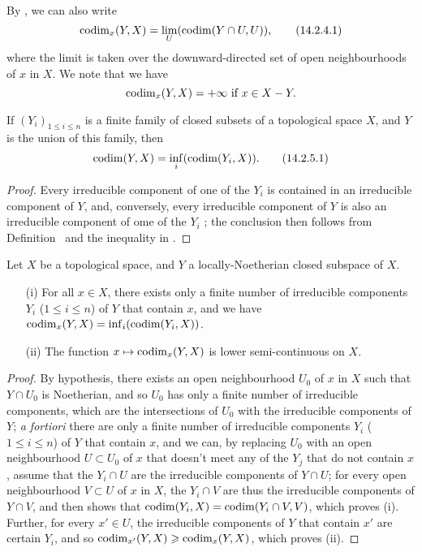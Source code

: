 By , we can also write
\[
\label{eq:0.14.2.4.1}
  \operatorname{codim}_x(Y,X)=\lim_U(\operatorname{codim}(Y\cap U,U)),
  \tag{14.2.4.1}
\]
where the limit is taken over the downward-directed set of open neighbourhoods of $x$ in $X$.
We note that we have
\[
  \operatorname{codim}_x(Y,X)=+\infty\text{ if }x\in X- Y.
\]

\begin{proposition}[14.2.5]
\label{0.14.2.5}
If $(Y_i)_{1\leq i\leq n}$ is a finite family of closed subsets of a topological space $X$, and $Y$ is the union of this family, then
\[
\label{eq:0.14.2.5.1}
  \operatorname{codim}(Y,X)=\inf_i(\operatorname{codim}(Y_i,X)).
  \tag{14.2.5.1}
\]
\end{proposition}

\begin{proof}
\label{proof-0.14.2.5}
Every irreducible component of one of the $Y_i$ is contained in an irreducible component of $Y$, and, conversely, every irreducible component of $Y$ is also an irreducible component of ome of the $Y_i$ ;
the conclusion then follows from Definition~ and the inequality in .
\end{proof}

\begin{corollary}
\label{0.14.2.6}
Let $X$ be a topological space, and $Y$ a locally-Noetherian closed subspace of $X$.
\begin{enumerate}
    \item[{\rm(i)}] For all $x\in X$, there exists only a finite number of irreducible components $Y_i$ ($1\leq i\leq n$) of $Y$ that contain $x$, and we have $\operatorname{codim}_x(Y,X)=\inf_i(\operatorname{codim}(Y_i,X))$.
    \item[{\rm(ii)}] The function $x\mapsto\codim_x(Y,X)$ is lower semi-continuous on $X$.
\end{enumerate}
\end{corollary}

\begin{proof}
\label{proof-0.14.2.6}
By hypothesis, there exists an open neighbourhood $U_0$ of $x$ in $X$ such that $Y\cap U_0$ is Noetherian, and so $U_0$ has only a finite number of irreducible components, which are the intersections of $U_0$ with the irreducible components of $Y$;
\emph{a fortiori} there are only a finite number of irreducible components $Y_i$ ($1\leq i\leq n$) of $Y$ that contain $x$, and we can, by replacing $U_0$ with an open neighbourhood $U\subset U_0$ of $x$ that doesn't meet any of the $Y_j$ that do not contain $x$, assume that the $Y_i\cap U$ are the irreducible components of $Y\cap U$;
for every open neighbourhood $V\subset U$ of $x$ in $X$, the $Y_i\cap V$ are thus the irreducible components of $Y\cap V$, and  then shows that $\operatorname{codim}(Y_i,X)=\operatorname{codim}(Y_i\cap V,V)$, which proves (i).
Further, for every $x'\in U$, the irreducible components of $Y$ that contain $x'$ are certain $Y_i$, and so $\operatorname{codim}_{x'}(Y,X)\geqslant\operatorname{codim}_x(Y,X)$, which proves (ii).
\end{proof}

